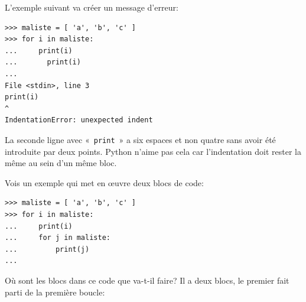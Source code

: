 L'exemple suivant va créer un message d'erreur:

\begin{Verbatim}[frame=single,rulecolor=\color{red}, label=erreur]
>>> maliste = [ 'a', 'b', 'c' ]
>>> for i in maliste:
...     print(i)
...       print(i)
...
File <stdin>, line 3
print(i)
^
IndentationError: unexpected indent
\end{Verbatim}

La seconde ligne avec «~\texttt{print}~» a six espaces et non quatre sans avoir été introduite par deux points. Python n'aime pas cela car l'indentation doit rester la même au sein d'un même bloc.

\begin{center}

\end{center}



Vois un exemple qui met en œuvre deux blocs de code:

\begin{Verbatim}[frame=single,rulecolor=\color{gray}, label=ne pas saisir]
>>> maliste = [ 'a', 'b', 'c' ]
>>> for i in maliste:
...     print(i)
...     for j in maliste:
...         print(j)
...
\end{Verbatim}

Où sont les blocs dans ce code que va-t-il faire?
Il a deux blocs, le premier fait parti de la première boucle:

